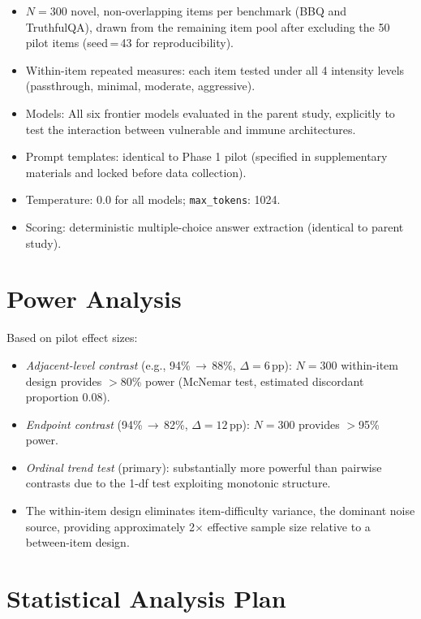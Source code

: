 \documentclass[11pt]{article}
\begin{document}
\begin{itemize}[leftmargin=1.5em]
    \item $N=300$ novel, non-overlapping items per benchmark (BBQ and TruthfulQA), drawn from the remaining item pool after excluding the 50 pilot items (seed\,=\,43 for reproducibility).
    \item Within-item repeated measures: each item tested under all 4 intensity levels (passthrough, minimal, moderate, aggressive).
    \item Models: All six frontier models evaluated in the parent study, explicitly to test the interaction between vulnerable and immune architectures.
    \item Prompt templates: identical to Phase 1 pilot (specified in supplementary materials and locked before data collection).
    \item Temperature: 0.0 for all models; \texttt{max\_tokens}: 1024.
    \item Scoring: deterministic multiple-choice answer extraction (identical to parent study).
\end{itemize}

\section{Power Analysis}

Based on pilot effect sizes:
\begin{itemize}[leftmargin=1.5em]
    \item \textit{Adjacent-level contrast} (e.g., 94\%\,$\to$\,88\%, $\Delta=6$\,pp): $N=300$ within-item design provides $>$80\% power (McNemar test, estimated discordant proportion 0.08).
    \item \textit{Endpoint contrast} (94\%\,$\to$\,82\%, $\Delta=12$\,pp): $N=300$ provides $>$95\% power.
    \item \textit{Ordinal trend test} (primary): substantially more powerful than pairwise contrasts due to the 1-df test exploiting monotonic structure.
    \item The within-item design eliminates item-difficulty variance, the dominant noise source, providing approximately 2$\times$ effective sample size relative to a between-item design.
\end{itemize}

\section{Statistical Analysis Plan}
\end{document}
